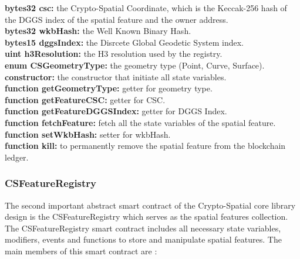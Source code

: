 \documentclass{isprs} %
\begin{document}
\textbf{bytes32 csc:} the Crypto-Spatial Coordinate, which is the Keccak-256 hash of the DGGS index of the spatial feature and the owner address. \\
\textbf{bytes32 wkbHash:} the Well Known Binary Hash. \\
\textbf{bytes15 dggsIndex:} the Disrcete Global Geodetic System index. \\
\textbf{uint h3Resolution:} the H3 resolution used by the registry.\\
\textbf{enum CSGeometryType:} the geometry type (Point, Curve, Surface). \\
\textbf{constructor:} the constructor that initiate all state variables. \\
\textbf{function getGeometryType:} getter for geometry type. \\
\textbf{function getFeatureCSC:} getter for CSC. \\
\textbf{function getFeatureDGGSIndex:} getter for DGGS Index. \\
\textbf{function fetchFeature:} fetch all the state variables of the spatial feature. \\
\textbf{function setWkbHash:} setter for wkbHash.\\
\textbf{function kill:} to permanently remove the spatial feature from the blockchain ledger.

\subsubsection{CSFeatureRegistry}\label{sec:CSFeatureRegistry}

The second important abstract smart contract of the Crypto-Spatial core library design is the CSFeatureRegistry which serves as the spatial features collection. 
The CSFeatureRegistry smart contract includes all necessary state variables, modifiers, events and functions to store and manipulate spatial features. The main members of this smart contract are :
\end{document}
